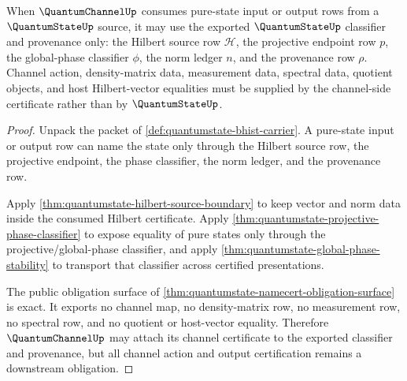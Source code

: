 \begin{theorem}
\label{thm:quantumstate-channel-pure-state-input-boundary}
When $\QuantumChannelUp$ consumes pure-state input or output rows from a
$\QuantumStateUp$ source, it may use the exported $\QuantumStateUp$ classifier
and provenance only: the Hilbert source row $\mathcal{H}$, the projective
endpoint row $p$, the global-phase classifier $\phi$, the norm ledger $n$, and
the provenance row $\rho$. Channel action, density-matrix data, measurement
data, spectral data, quotient objects, and host Hilbert-vector equalities must
be supplied by the channel-side certificate rather than by
$\QuantumStateUp$.
\end{theorem}
\begin{proof}
Unpack the packet of \autoref{def:quantumstate-bhist-carrier}. A pure-state
input or output row can name the state only through the Hilbert source row,
the projective endpoint, the phase classifier, the norm ledger, and the
provenance row.

Apply \autoref{thm:quantumstate-hilbert-source-boundary} to keep vector and
norm data inside the consumed Hilbert certificate. Apply
\autoref{thm:quantumstate-projective-phase-classifier} to expose equality of
pure states only through the projective/global-phase classifier, and apply
\autoref{thm:quantumstate-global-phase-stability} to transport that classifier
across certified presentations.

The public obligation surface of
\autoref{thm:quantumstate-namecert-obligation-surface} is exact. It exports no
channel map, no density-matrix row, no measurement row, no spectral row, and
no quotient or host-vector equality. Therefore $\QuantumChannelUp$ may attach
its channel certificate to the exported classifier and provenance, but all
channel action and output certification remains a downstream obligation.
\end{proof}
